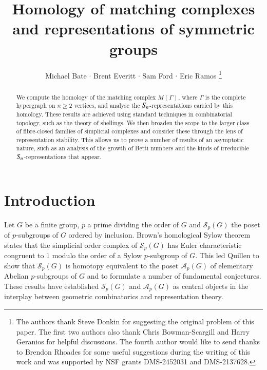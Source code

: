 \documentclass[matann2]{svjour1}
\title{Homology of matching complexes and representations
of symmetric groups}
\author{Michael Bate %
$\cdot$
Brent Everitt %
$\cdot$
Sam Ford
$\cdot$
Eric Ramos
\thanks{The authors thank Steve Donkin for suggesting 
  the original problem of this paper.
  The first two authors also thank Chris 
  Bowman-Scargill and Harry Geranios for helpful discussions.
The fourth author would like to send thanks to Brendon Rhoades for
some useful suggestions during the writing of this work
and was supported by NSF grants DMS-2452031 and DMS-2137628.}
}
\institute{Michael Bate,
  Brent Everitt,
  Sam Ford
  \at
Department of Mathematics, 
University of York, 
York
YO10 5DD, UK. 
\email{michael.bate@york.ac.uk,
brent.everitt@york.ac.uk,
sam.ford7@gmx.co.uk}
\and
Eric Ramos
\at
Department of Mathematical Sciences,
Stevens Institute of Technology, Hoboken, NJ 07030, USA.
\email{eramos3@stevens.edu}
}
\def\symn{S_{\kern-1pt n}}
\newcommand{\Sym}[1]{S_{\kern-1pt {#1}}}
\begin{document}
\maketitle

\begin{abstract}
We compute the homology of the matching complex
$M(\Gamma)$, where $\Gamma$ is the complete hypergraph on $n\geq 2$
vertices, and analyse the $\Sym{n}$-representations carried by this
homology. These results are achieved using standard techniques in
combinatorial topology, such as the theory of shellings.
We then broaden the scope to the larger class of fibre-closed families of
simplicial complexes and
consider these through the lens of representation stability.
This allows us to prove a number of results of an asymptotic nature,
such as an analysis of the growth of Betti numbers and the
kinds of irreducible $\symn$-representations that
appear.
\end{abstract} 

\maketitle


\section*{Introduction}

Let $G$ be a finite group, $p$ a prime dividing the order of $G$ and
$\mathcal{S}_p(G)$ the poset of $p$-subgroups of $G$ ordered 
by inclusion. 
Brown's homological Sylow theorem \cite{MR0385008} states that
the simplicial order complex of $\mathcal{S}_p(G)$ 
has Euler characteristic congruent to $1$ modulo 
the order of a Sylow $p$-subgroup of $G$. This led
Quillen \cite{MR0493916} to show that $\mathcal{S}_p(G)$ is 
homotopy equivalent to
the poset $\mathcal{A}_p(G)$ of elementary 
Abelian $p$-subgroups
of $G$ and to formulate a number of fundamental conjectures.
These results have 
established $\mathcal{S}_p(G)$ and 
$\mathcal{A}_p(G)$
as central objects
in the interplay between geometric combinatorics and
representation theory.
\end{document}
